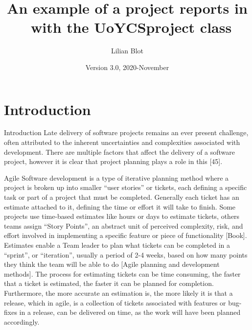 \documentclass{UoYCSproject}
\author{Lilian Blot}
\title{An example of a project reports in \LaTeXe\ with the   \textsf{UoYCSproject} class}
\date{Version 3.0, 2020-November}
\begin{document}
    \maketitle
    \listoffigures
    \listoftables

\chapter{Introduction}
\label{ch:introduction}
Introduction
Late delivery of software projects remains an ever present challenge, often attributed to the inherent uncertainties and complexities associated with development.
There are multiple factors that affect the delivery of a software project, however it is clear that project planning plays a role in this [45]. \par
Agile Software development is a type of iterative planning method where a project is broken up into smaller “user stories” or tickets, each defining a specific task or part of a project that must be completed.
Generally each ticket has an estimate attached to it, defining the time or effort it will take to finish.
Some projects use time-based estimates like hours or days to estimate tickets, others teams assign “Story Points”, an abstract unit of perceived complexity, risk, and effort involved in implementing a specific feature or piece of functionality [Book].
Estimates enable a Team leader to plan what tickets can be completed in a “sprint”, or “iteration”, usually a period of 2-4 weeks, based on how many points they think the team will be able to do [Agile planning and development methods].
The process for estimating tickets can be time consuming, the faster that a ticket is estimated, the faster it can be planned for completion.
Furthermore, the more accurate an estimation is, the more likely it is that a release, which in agile, is a collection of tickets associated with features or bug-fixes in a release, can be delivered on time, as the work will have been planned accordingly. \par
\end{document}
